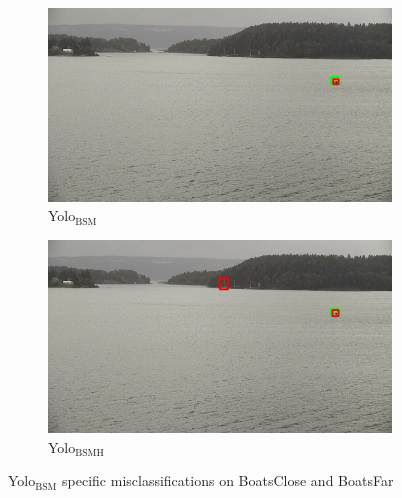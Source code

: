 \begin{figure}[h!]
\begin{subfigure}{.5\textwidth}
  \centering
  \includegraphics[width=0.9\linewidth]{results/case_buildings/yolo23/2better/yolo2/selected_08_09_frame5360.jpg}
  \caption{Yolo$_{\text{BSM}}$}
\end{subfigure}%
\begin{subfigure}{.5\textwidth}
  \centering
  \includegraphics[width=.9\linewidth]{results/case_buildings/yolo23/2better/yolo3/selected_08_09_frame5360.jpg}
  \caption{Yolo$_{\text{BSMH}}$}
\end{subfigure}
\caption{Yolo$_{\text{BSM}}$ specific misclassifications on BoatsClose and BoatsFar}
\label{img:yolo2_misclas}


\end{figure}
